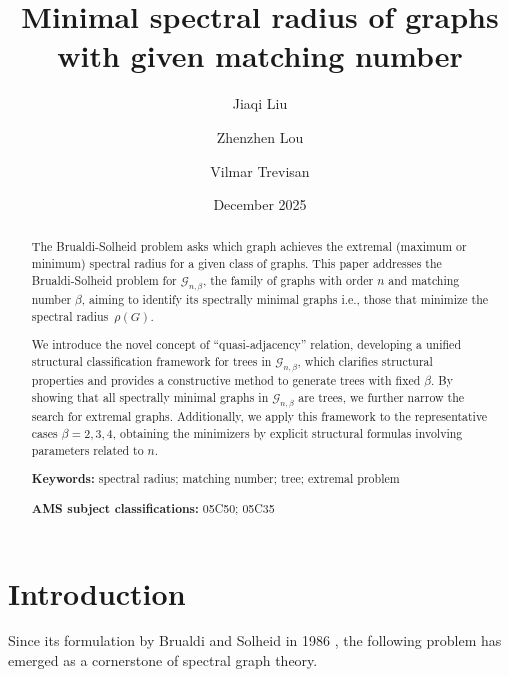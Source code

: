 \documentclass[12pt]{amsart}
\begin{document}
\title{Minimal spectral radius of graphs with given matching  number}
\author[J. Liu]{Jiaqi Liu}
\author[Z. Lou] {Zhenzhen Lou}
\address{College of Science, University of Shanghai for Science and Technology,
 Shanghai, 200093, P.R. China}
 \author[V. Trevisan]{Vilmar Trevisan}
\address{Instituto de Matemática e Estatística,  Universidade Federal do Rio Grande do Sul, Porto Alegre, Brazil}
\date{December 2025}


\begin{abstract}
The Brualdi-Solheid problem asks which graph achieves the extremal (maximum or minimum) spectral radius for a given class of graphs.
This paper addresses the Brualdi-Solheid problem for \( \mathcal{G}_{n,\beta} \), the family of graphs with order \( n \) and matching number \( \beta \), aiming to identify its spectrally minimal graphs i.e., those that minimize the spectral radius \(\rho(G)\).

We introduce the novel concept of ``quasi-adjacency'' relation, developing a unified structural classification framework for trees in \(\mathcal{G}_{n,\beta}\), which clarifies structural properties and provides a constructive method to generate trees with fixed \(\beta\). By showing that all spectrally minimal graphs in \( \mathcal{G}_{n,\beta} \) are trees, we further narrow the search for extremal graphs. Additionally, we apply this framework to the representative cases \(\beta=2,3,4\), obtaining  the minimizers  by explicit structural formulas involving parameters related to \(n\).

 \begin{flushleft}
\textbf{Keywords:} spectral radius; matching number; tree; extremal problem
\end{flushleft}
\textbf{AMS subject classifications:} 05C50; 05C35
\end{abstract}

\maketitle

\section{Introduction}\label{se-1}


Since its formulation by Brualdi and Solheid in 1986 \cite{Brualdi1986}, the following problem has emerged as a cornerstone of spectral graph theory.
\end{document}
